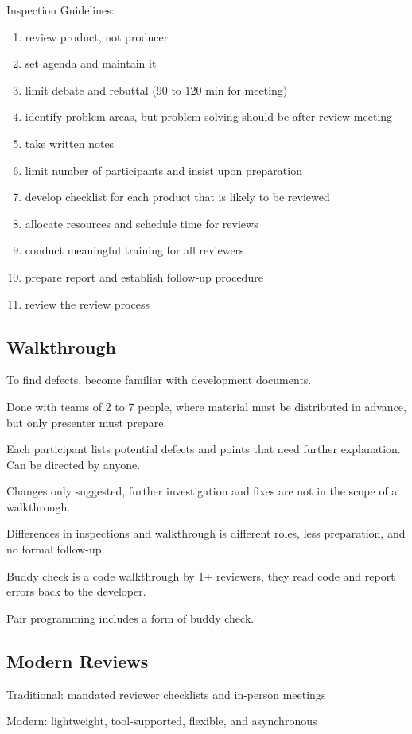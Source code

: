 \documentclass[11pt]{article}
\begin{document}
Inspection Guidelines:
\begin{enumerate}
\item review product, not producer
\item set agenda and maintain it
\item limit debate and rebuttal (90 to 120 min for meeting)
\item identify problem areas, but problem solving should be after review meeting
\item take written notes
\item limit number of participants and insist upon preparation
\item develop checklist for each product that is likely to be reviewed
\item allocate resources and schedule time for reviews
\item conduct meaningful training for all reviewers
\item prepare report and establish follow-up procedure
\item review the review process
\end{enumerate}
\subsection{Walkthrough}
\label{sec:orgf238564}
To find defects, become familiar with development documents.

Done with teams of 2 to 7 people, where material must be distributed in advance, but only presenter
must prepare.

Each participant lists potential defects and points that need further explanation.
Can be directed by anyone.

Changes only suggested, further investigation and fixes are not in the scope of a walkthrough.

Differences in inspections and walkthrough is different roles, less preparation, and no formal
follow-up.

Buddy check is a code walkthrough by 1+ reviewers, they read code and report errors back to the
developer.

Pair programming includes a form of buddy check.
\subsection{Modern Reviews}
\label{sec:org0d26961}
Traditional: mandated reviewer checklists and in-person meetings

Modern: lightweight, tool-supported, flexible, and asynchronous
\end{document}
